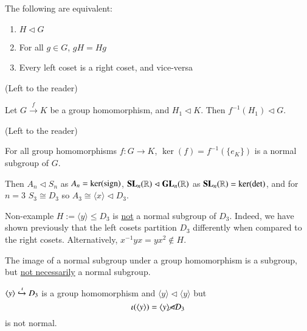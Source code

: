 \documentclass[12pt, a4paper, twoside, openright, titlepage]{book}
\begin{document}
\begin{rmk}{}{}
        The following are equivalent:
        \begin{enumerate}
                \item $H \vartriangleleft G$
                \item For all $g \in G$, $gH = Hg$
                \item Every left coset is a right coset, and vice-versa
        \end{enumerate}
\end{rmk}
\begin{proof*}{}{}
        (Left to the reader)
\end{proof*}

\begin{prop}{}{}
        Let $G\xrightarrow{f}K$ be a group homomorphism, and $H_1 \vartriangleleft K$. Then $f^{-1}(H_1) \vartriangleleft G$.
\end{prop}
\begin{proof*}{}{}
        (Left to the reader)
\end{proof*}

\begin{cor}{}{}
        For all group homomorphisms $f:G\rightarrow K$, $\ker(f) = f^{-1}(\{e_K\})$ is a normal subgroup of $G$.
\end{cor}

\begin{eg}{}{}
        Then $A_n\vartriangleleft S_n$ as $A_n = \ker(\operatorname{sign})$, $\mathbf{SL}_n(\mathbb R) \vartriangleleft \mathbf{GL}_n(\mathbb R)$ as $\mathbf{SL}_n(\mathbb R) = \ker(\det)$, and for $n = 3$ $S_3 \cong D_3$ so $A_3 \cong \langle x \rangle \vartriangleleft D_3$.
\end{eg}

\begin{eg}{Non-example}{}
        $H := \langle y \rangle \leq D_3$ is \underline{not} a normal subgroup of $D_3$. Indeed, we have shown previously that the left cosets partition $D_3$ differently when compared to the right cosets. Alternatively, $x^{-1}yx = yx^2 \notin H$.
\end{eg}

\begin{rmk}{}{}
        The image of a normal subgroup under a group homomorphism is a subgroup, but \underline{not necessarily} a normal subgroup.
\end{rmk}

\begin{eg}{}{}
        $\langle y \rangle \xhookrightarrow{\iota}D_3$ is a group homomorphism and $\langle y \rangle \vartriangleleft \langle y \rangle$ but $$\iota(\langle y \rangle) = \langle y \rangle \cancel{\vartriangleleft} D_3$$ is not normal.
\end{eg}
\end{document}
